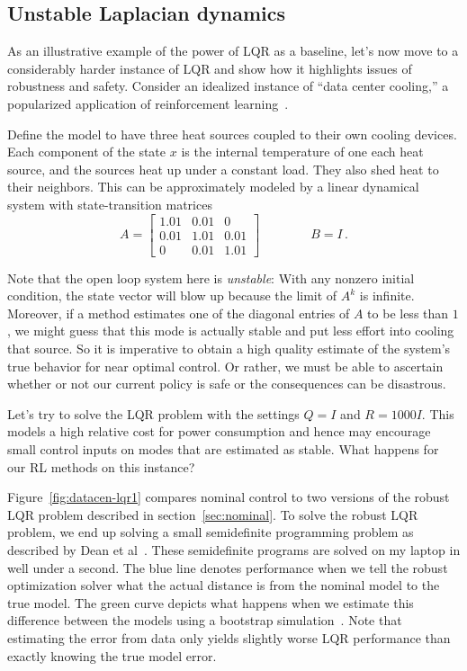 \documentclass[11pt]{article}
\newcommand{\fig}[1]{Figure~\ref{fig:#1}}
\numberwithin{equation}{section}
\begin{document}
\subsection{Unstable Laplacian dynamics}

As an illustrative example of the power of LQR as a baseline, let's now move to a considerably harder instance of LQR and show how it highlights issues of robustness and safety.  Consider an idealized instance of ``data center cooling,'' a popularized application of reinforcement learning~\cite{gao2014machine}.

Define the model to have three heat sources coupled to their own cooling devices.  Each component of the state $x$ is the internal temperature of one each heat source, and the sources heat up under a constant load.  They also shed heat to their neighbors. This can be approximately modeled by a linear dynamical system with state-transition matrices
\begin{equation*}
A = \begin{bmatrix} 1.01 & 0.01 & 0\\ 0.01 & 1.01 & 0.01 \\ 0 & 0.01 & 1.01 \end{bmatrix}
\qquad \qquad B = I\,.
\end{equation*}


Note that the open loop system here is \emph{unstable}: With any nonzero initial condition, the state vector will blow up because the limit of $A^k$ is infinite. Moreover, if a method estimates one of the diagonal entries of $A$ to be less than $1$, we might guess that this mode is actually stable and put less effort into cooling that source. So it is imperative to obtain a high quality estimate of the system's true behavior for near optimal control. Or rather, we must be able to ascertain whether or not our current policy is safe or the consequences can be disastrous. 

Let's try to solve the LQR problem with the settings $Q = I$ and $R= 1000 I$. This models a high relative cost for power consumption and hence may encourage small control inputs on modes that are estimated as stable. What happens for our RL methods on this instance?

\fig{datacen-lqr1} compares nominal control to two versions of the robust LQR problem described in section~\ref{sec:nominal}. To solve the robust LQR problem, we end up solving a small semidefinite programming problem as described by Dean et al~\cite{Dean17}. These semidefinite programs are solved on my laptop in well under a second. The blue line denotes performance when we tell the robust optimization solver what the actual distance is from the nominal model to the true model. The green curve depicts what happens when we estimate this difference between the models using a bootstrap simulation~\cite{efron79,shao2012jackknife}. Note that estimating the error from data only yields slightly worse LQR performance than exactly knowing the true model error.
\end{document}

